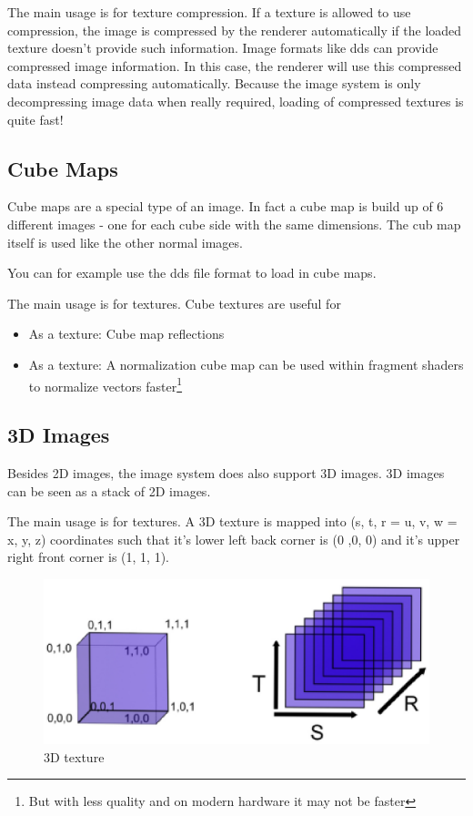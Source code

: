 The main usage is for texture compression. If a texture is allowed to use compression, the image is compressed by the renderer automatically if the loaded texture doesn't provide such information. Image formats like dds can provide compressed image information. In this case, the renderer will use this compressed data instead compressing automatically. Because the image system is only decompressing image data when really required, loading of compressed textures is quite fast!




\subsection{Cube Maps}
Cube maps are a special type of an image. In fact a cube map is build up of 6 different images - one for each cube side with the same dimensions. The cub map itself is used like the other normal images.

You can for example use the dds file format to load in cube maps.

The main usage is for textures. Cube textures are useful for
\begin{itemize}
\item{As a texture: Cube map reflections}
\item{As a texture: A normalization cube map can be used within fragment shaders to normalize vectors faster\footnote{But with less quality and on modern hardware it may not be faster}}
\end{itemize}




\subsection{3D Images}
Besides 2D images, the image system does also support 3D images. 3D images can be seen as a stack of 2D images.

The main usage is for textures. A 3D texture is mapped into (s, t, r = u, v, w = x, y, z) coordinates such that it's lower left back corner is (0 ,0, 0) and it's upper right front corner is (1, 1, 1).

\begin{figure}
  \begin{center}
    \includegraphics{pics/3DTex_1.eps}
  \end{center}
  \caption{3D texture}
  \label{fig:3D texture}
\end{figure}

